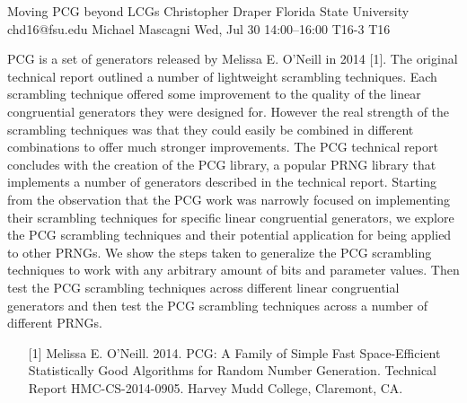 \begin{talk}
  {Moving PCG beyond LCGs}%
  {Christopher Draper}%
  {Florida State University}%
  {chd16@fsu.edu}%
  {Michael Mascagni}%
  {}%
  {Wed, Jul 30 14:00–16:00}%
  {T16-3}%
  {T16}%
  
				
			
PCG is a set of generators released by Melissa E. O’Neill in 2014 [1]. The original technical report outlined a number of lightweight
scrambling techniques. Each scrambling technique offered some improvement to the quality of the linear congruential generators
they were designed for. However the real strength of the scrambling techniques was that they could easily be combined in different
combinations to offer much stronger improvements. The PCG technical report concludes with the creation of the PCG library, a
popular PRNG library that implements a number of generators described in the technical report. Starting from the observation that the
PCG work was narrowly focused on implementing their scrambling techniques for specific linear congruential generators, we explore
the PCG scrambling techniques and their potential application for being applied to other PRNGs. We show the steps taken to generalize the PCG
scrambling techniques to work with any arbitrary amount of bits and parameter values. Then test the PCG scrambling techniques
across different linear congruential generators and then test the PCG scrambling techniques across a number of different PRNGs.
\medskip

\begin{enumerate}
	\item[{[1]}] Melissa E. O’Neill. 2014. PCG: A Family of Simple Fast Space-Efficient Statistically Good Algorithms for Random Number Generation. Technical Report HMC-CS-2014-0905. Harvey Mudd College, Claremont, CA.
\end{enumerate}

\end{talk}

